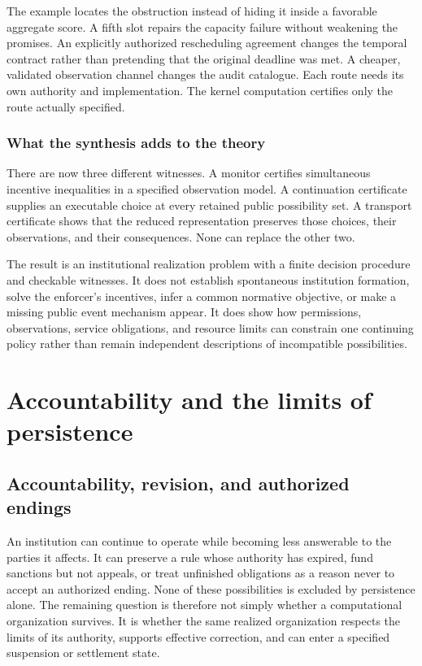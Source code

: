 The example locates the obstruction instead of hiding it inside a favorable aggregate score. A fifth slot repairs the capacity failure without weakening the promises. An explicitly authorized rescheduling agreement changes the temporal contract rather than pretending that the original deadline was met. A cheaper, validated observation channel changes the audit catalogue. Each route needs its own authority and implementation. The kernel computation certifies only the route actually specified.

\subsection{What the synthesis adds to the theory}
There are now three different witnesses. A monitor certifies simultaneous incentive inequalities in a specified observation model. A continuation certificate supplies an executable choice at every retained public possibility set. A transport certificate shows that the reduced representation preserves those choices, their observations, and their consequences. None can replace the other two.

The result is an institutional realization problem with a finite decision procedure and checkable witnesses. It does not establish spontaneous institution formation, solve the enforcer's incentives, infer a common normative objective, or make a missing public event mechanism appear. It does show how permissions, observations, service obligations, and resource limits can constrain one continuing policy rather than remain independent descriptions of incompatible possibilities.
\FloatBarrier

\FloatBarrier

\chapter{Accountability and the limits of persistence}\label{MS:book:chapter-97}

\section{Accountability, revision, and authorized endings}\label{MS:sec:accountability}

An institution can continue to operate while becoming less answerable to the parties it affects. It can preserve a rule whose authority has expired, fund sanctions but not appeals, or treat unfinished obligations as a reason never to accept an authorized ending. None of these possibilities is excluded by persistence alone. The remaining question is therefore not simply whether a computational organization survives. It is whether the same realized organization respects the limits of its authority, supports effective correction, and can enter a specified suspension or settlement state.


